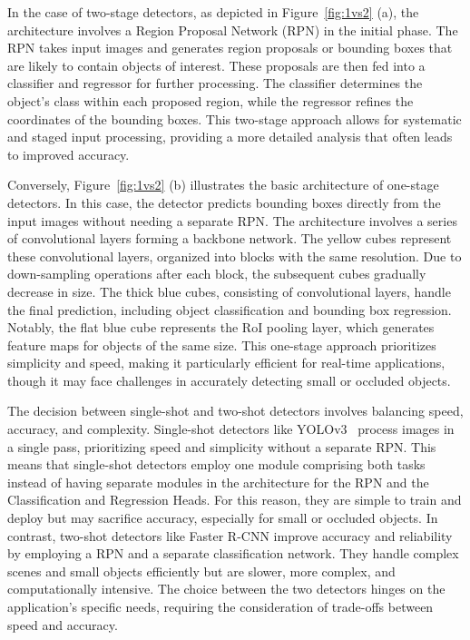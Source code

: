 In the case of two-stage detectors, as depicted in Figure~\ref{fig:1vs2} (a), the architecture involves a Region Proposal Network (RPN) in the initial phase.
The RPN takes input images and generates region proposals or bounding boxes that are likely to contain objects of interest.
These proposals are then fed into a classifier and regressor for further processing.
The classifier determines the object's class within each proposed region, while the regressor refines the coordinates of the bounding boxes.
This two-stage approach allows for systematic and staged input processing, providing a more detailed analysis that often leads to improved accuracy.

Conversely, Figure~\ref{fig:1vs2} (b) illustrates the basic architecture of one-stage detectors.
In this case, the detector predicts bounding boxes directly from the input images without needing a separate RPN\@.
The architecture involves a series of convolutional layers forming a backbone network.
The yellow cubes represent these convolutional layers, organized into blocks with the same resolution.
Due to down-sampling operations after each block, the subsequent cubes gradually decrease in size.
The thick blue cubes, consisting of convolutional layers, handle the final prediction, including object classification and bounding box regression.
Notably, the flat blue cube represents the RoI pooling layer, which generates feature maps for objects of the same size.
This one-stage approach prioritizes simplicity and speed, making it particularly efficient for real-time applications, though it may face challenges in accurately detecting small or occluded objects.


The decision between single-shot and two-shot detectors involves balancing speed, accuracy, and complexity.
Single-shot detectors like YOLOv3~\cite{YOLOv3} process images in a single pass, prioritizing speed and simplicity without a separate RPN. This means that single-shot detectors employ one module comprising both tasks instead of having separate modules in the architecture for the RPN and the Classification and Regression Heads.
For this reason, they are simple to train and deploy but may sacrifice accuracy, especially for small or occluded objects.
In contrast, two-shot detectors like Faster R-CNN improve accuracy and reliability by employing a RPN and a separate classification network.
They handle complex scenes and small objects efficiently but are slower, more complex, and computationally intensive.
The choice between the two detectors hinges on the application's specific needs, requiring the consideration of trade-offs between speed and accuracy.


